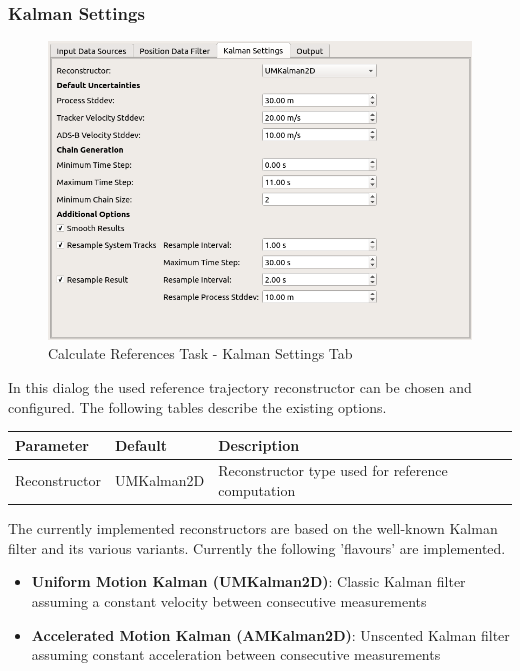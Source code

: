 \subsubsection*{Kalman Settings}

\begin{figure}[H]
    \center
      \includegraphics[frame,width=14cm]{figures/ui_task_references_tab_kalman.png}
    \caption{Calculate References Task - Kalman Settings Tab}
\end{figure}

In this dialog the used reference trajectory reconstructor can be chosen and configured.
The following tables describe the existing options.

\begin{table}[H]
    \center
    \begin{tabularx}{\textwidth}{ | l | l | X |}
        \hline
        \textbf{Parameter} & \textbf{Default} & \textbf{Description} \\ \hline
        Reconstructor & UMKalman2D & Reconstructor type used for reference computation \\ \hline
    \end{tabularx}
\end{table}

The currently implemented reconstructors are based on the well-known Kalman filter and its various variants.
Currently the following 'flavours' are implemented. \\

\begin{itemize}
    \item \textbf{Uniform Motion Kalman (UMKalman2D)}: 
        Classic Kalman filter assuming a constant velocity between consecutive measurements
    \item \textbf{Accelerated Motion Kalman (AMKalman2D)}: 
        Unscented Kalman filter assuming constant acceleration between consecutive measurements \\
\end{itemize}

